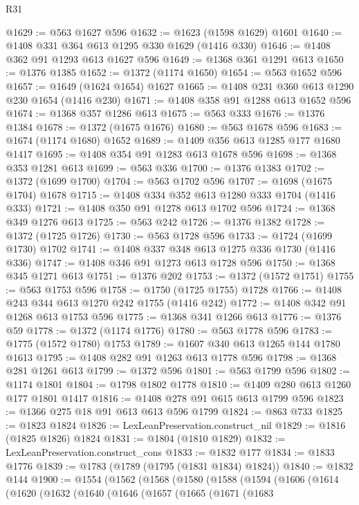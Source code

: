 \begin{lexlean}{R31}
\begin{coremodule}
@1629 := @563 @1627 @596
@1632 := @1623 (@1598 @1629) @1601
@1640 := @1408 @331 @364 @613 @1295 @330 @1629 (@1416 @330)
@1646 := @1408 @362 @91 @1293 @613 @1627 @596
@1649 := @1368 @361 @1291 @613
@1650 := @1376 @1385
@1652 := @1372 (@1174 @1650)
@1654 := @563 @1652 @596
@1657 := @1649 (@1624 @1654) @1627
@1665 := @1408 @231 @360 @613 @1290 @230 @1654 (@1416 @230)
@1671 := @1408 @358 @91 @1288 @613 @1652 @596
@1674 := @1368 @357 @1286 @613
@1675 := @563 @333
@1676 := @1376 @1384
@1678 := @1372 (@1675 @1676)
@1680 := @563 @1678 @596
@1683 := @1674 (@1174 @1680) @1652
@1689 := @1409 @356 @613 @1285 @177 @1680 @1417
@1695 := @1408 @354 @91 @1283 @613 @1678 @596
@1698 := @1368 @353 @1281 @613
@1699 := @563 @336
@1700 := @1376 @1383
@1702 := @1372 (@1699 @1700)
@1704 := @563 @1702 @596
@1707 := @1698 (@1675 @1704) @1678
@1715 := @1408 @334 @352 @613 @1280 @333 @1704 (@1416 @333)
@1721 := @1408 @350 @91 @1278 @613 @1702 @596
@1724 := @1368 @349 @1276 @613
@1725 := @563 @242
@1726 := @1376 @1382
@1728 := @1372 (@1725 @1726)
@1730 := @563 @1728 @596
@1733 := @1724 (@1699 @1730) @1702
@1741 := @1408 @337 @348 @613 @1275 @336 @1730 (@1416 @336)
@1747 := @1408 @346 @91 @1273 @613 @1728 @596
@1750 := @1368 @345 @1271 @613
@1751 := @1376 @202
@1753 := @1372 (@1572 @1751)
@1755 := @563 @1753 @596
@1758 := @1750 (@1725 @1755) @1728
@1766 := @1408 @243 @344 @613 @1270 @242 @1755 (@1416 @242)
@1772 := @1408 @342 @91 @1268 @613 @1753 @596
@1775 := @1368 @341 @1266 @613
@1776 := @1376 @59
@1778 := @1372 (@1174 @1776)
@1780 := @563 @1778 @596
@1783 := @1775 (@1572 @1780) @1753
@1789 := @1607 @340 @613 @1265 @144 @1780 @1613
@1795 := @1408 @282 @91 @1263 @613 @1778 @596
@1798 := @1368 @281 @1261 @613
@1799 := @1372 @596
@1801 := @563 @1799 @596
@1802 := @1174 @1801
@1804 := @1798 @1802 @1778
@1810 := @1409 @280 @613 @1260 @177 @1801 @1417
@1816 := @1408 @278 @91 @615 @613 @1799 @596
@1823 := @1366 @275 @18 @91 @613 @613 @596 @1799
@1824 := @863 @733
@1825 := @1823 @1824
@1826 := LexLeanPreservation.construct_nil
@1829 := @1816 (@1825 @1826) @1824
@1831 := @1804 (@1810 @1829)
@1832 := LexLeanPreservation.construct_cons
@1833 := @1832 @177
@1834 := @1833 @1776
@1839 := @1783 (@1789 (@1795 (@1831 @1834) @1824))
@1840 := @1832 @144
@1900 := @1554
    (@1562
      (@1568
        (@1580
          (@1588
            (@1594
              (@1606
                (@1614
                  (@1620
                    (@1632
                      (@1640
                        (@1646
                          (@1657
                            (@1665
                              (@1671
                                (@1683

\end{coremodule}
\end{lexlean}
